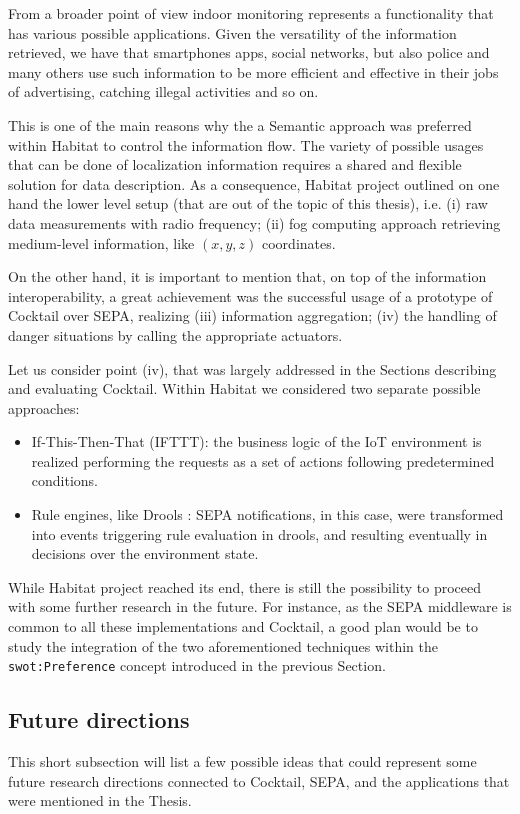 From a broader point of view indoor monitoring represents a functionality that has various possible applications. Given the versatility of the information retrieved, we have that smartphones apps, social networks, but also police and many others use such information to be more efficient and effective in their jobs of advertising, catching illegal activities and so on.

This is one of the main reasons why the a Semantic approach was preferred within Habitat to control the information flow. The variety of possible usages that can be done of localization information requires a shared and flexible solution for data description. As a consequence, Habitat project outlined on one hand the lower level setup (that are out of the topic of this thesis), i.e. (i) raw data measurements with radio frequency; (ii) fog computing approach retrieving medium-level information, like $(x,y,z)$ coordinates. 

On the other hand, it is important to mention that, on top of the information interoperability, a great achievement was the successful usage of a prototype of Cocktail over SEPA, realizing (iii) information aggregation; (iv) the handling of danger situations by calling the appropriate actuators.

Let us consider point (iv), that was largely addressed in the Sections describing and evaluating Cocktail. Within Habitat we considered two separate possible approaches:
\begin{itemize}
\item If-This-Then-That (IFTTT): the business logic of the IoT environment is realized performing the requests as a set of actions following predetermined conditions. 

\item Rule engines, like Drools \cite{proctor2011drools}: SEPA notifications, in this case, were transformed into events triggering rule evaluation in drools, and resulting eventually in decisions over the environment state.
\end{itemize}

While Habitat project reached its end, there is still the possibility to proceed with some further research in the future. For instance, as the SEPA middleware is common to all these implementations and Cocktail, a good plan would be to study the integration of the two aforementioned techniques within the \texttt{swot:Preference} concept introduced in the previous Section. 

\subsection{Future directions}
This short subsection will list a few possible ideas that could represent some future research directions connected to Cocktail, SEPA, and the applications that were mentioned in the Thesis. 

